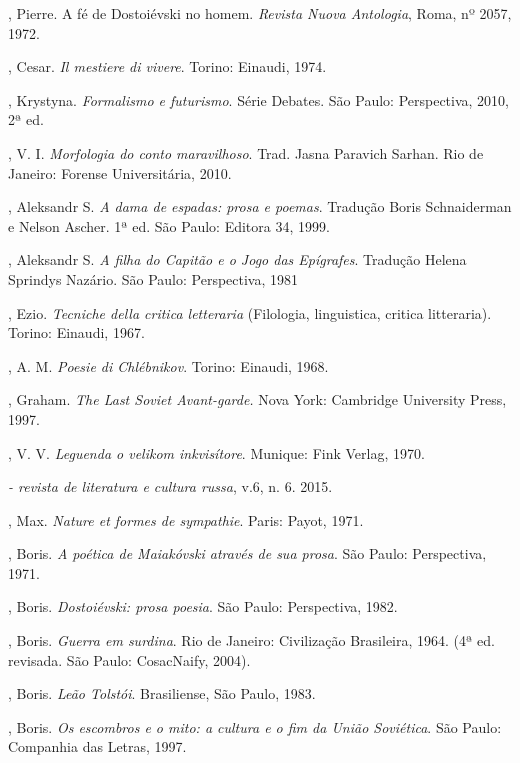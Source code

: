 \begin{Parskip}
, Pierre. A fé de Dostoiévski no homem. \emph{Revista Nuova Antologia}, Roma, nº 2057, 1972.

, Cesar. \emph{Il mestiere di vivere}. Torino: Einaudi, 1974.

, Krystyna. \emph{Formalismo e futurismo}. Série Debates. São Paulo: Perspectiva, 2010, 2ª ed.

, V. I. \emph{Morfologia do conto maravilhoso}. Trad. Jasna
Paravich Sarhan. Rio de Janeiro: Forense Universitária, 2010.

, Aleksandr S. \emph{A dama de espadas: prosa e poemas}. Tradução Boris Schnaiderman e Nelson Ascher. 1ª ed. São Paulo: Editora 34, 1999.

, Aleksandr S. \emph{A filha do Capitão e o Jogo das Epígrafes}. Tradução Helena Sprindys Nazário. São Paulo: Perspectiva, 1981

, Ezio. \emph{Tecniche della critica letteraria} (Filologia,
linguistica, critica litteraria). Torino: Einaudi, 1967.

, A. M. \emph{Poesie di Chlébnikov}. Torino: Einaudi, 1968.

, Graham. \emph{The Last Soviet Avant-garde.} Nova York:
Cambridge University Press, 1997.

, V. V. \emph{Leguenda o velikom inkvisítore}. Munique: Fink
Verlag, 1970.

\emph{ - revista de literatura e cultura russa}, v.6, n. 6. 2015.

, Max. \emph{Nature et formes de sympathie}. Paris:
Payot, 1971.

, Boris. \emph{A poética de Maiakóvski através de sua prosa}. São Paulo: Perspectiva, 1971.

, Boris. \emph{Dostoiévski: prosa poesia}. São Paulo: Perspectiva, 1982.

, Boris. \emph{Guerra em surdina}. Rio de Janeiro: Civilização Brasileira, 1964. (4ª ed.
  revisada. São Paulo: CosacNaify, 2004).

, Boris. \emph{Leão Tolstói}. Brasiliense, São Paulo, 1983.

, Boris. \emph{Os escombros e o mito: a cultura e o fim da União Soviética}. São Paulo: Companhia das Letras, 1997.


\end{Parskip}
